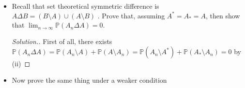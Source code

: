 \documentclass[12pt]{article}
\begin{document}
\begin{enumerate}
\begin{itemize}
\begin{align*}
				\end{align*}
				\item[(iii)] Recall that set theoretical symmetric difference is $A \Delta B = (B\setminus A) \cup (A \setminus B)$ 
				. Prove that, assuming $A^* = A_* = A$, then show that $\lim_{n \to \infty}\mathbb{P}(A_n \Delta A)	 =0$.
				\begin{proof}[Solution.]
					First of all, there exists $\mathbb{P}(A_n \Delta A) = \mathbb{P}(A_n \setminus A) + \mathbb{P}(A \setminus A_n)  = \mathbb{P}(A_n \setminus A^*) + \mathbb{P}(A_*\setminus A_n) = 0$ by (ii)
				\end{proof}
				\item[(iv)] Now prove the same thing under a weaker condition 
			\end{itemize}

\end{enumerate}
\end{document}
